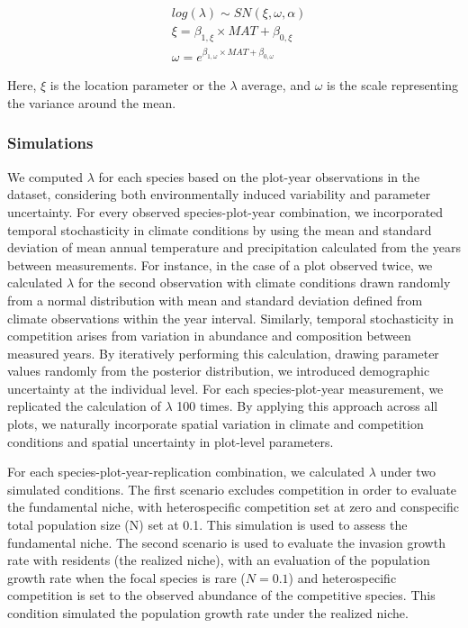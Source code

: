 \documentclass[12pt]{article}
\begin{document}
\begin{equation}
\begin{split}
&log(\lambda) \sim SN(\xi, \omega, \alpha) \\[2pt]
&\xi = \beta_{1, \xi} \times MAT + \beta_{0, \xi} \\[2pt]
&\omega = e^{\beta_{1, \omega} \times MAT + \beta_{0, \omega}}
\end{split}
\label{eq:metamodel}\end{equation}

Here, \(\xi\) is the location parameter or the \(\lambda\) average, and
\(\omega\) is the scale representing the variance around the mean.

\hypertarget{simulations}{%
\subsubsection{Simulations}\label{simulations}}

We computed \(\lambda\) for each species based on the plot-year
observations in the dataset, considering both environmentally induced
variability and parameter uncertainty. For every observed
species-plot-year combination, we incorporated temporal stochasticity in
climate conditions by using the mean and standard deviation of mean
annual temperature and precipitation calculated from the years between
measurements. For instance, in the case of a plot observed twice, we
calculated \(\lambda\) for the second observation with climate
conditions drawn randomly from a normal distribution with mean and
standard deviation defined from climate observations within the year
interval. Similarly, temporal stochasticity in competition arises from
variation in abundance and composition between measured years. By
iteratively performing this calculation, drawing parameter values
randomly from the posterior distribution, we introduced demographic
uncertainty at the individual level. For each species-plot-year
measurement, we replicated the calculation of \(\lambda\) 100 times. By
applying this approach across all plots, we naturally incorporate
spatial variation in climate and competition conditions and spatial
uncertainty in plot-level parameters.

For each species-plot-year-replication combination, we calculated
\(\lambda\) under two simulated conditions. The first scenario excludes
competition in order to evaluate the fundamental niche, with
heterospecific competition set at zero and conspecific total population
size (N) set at 0.1. This simulation is used to assess the fundamental
niche. The second scenario is used to evaluate the invasion growth rate
with residents (the realized niche), with an evaluation of the
population growth rate when the focal species is rare (\(N=0.1\)) and
heterospecific competition is set to the observed abundance of the
competitive species. This condition simulated the population growth rate
under the realized niche.
\end{document}
